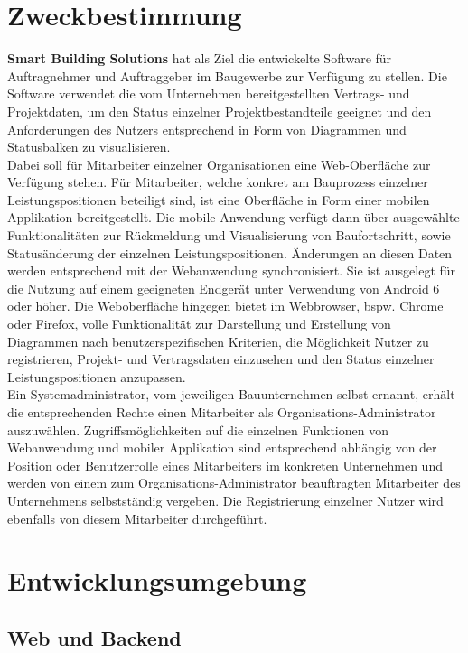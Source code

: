 {\section{Zweckbestimmung}\label{sec:zweckbestimmung}
\textbf{Smart Building Solutions} hat als Ziel die entwickelte Software f\"ur Auftragnehmer und Auftraggeber im Baugewerbe zur Verf\"ugung zu stellen.  Die Software verwendet die vom Unternehmen bereitgestellten Vertrags- und Projektdaten,  um den Status einzelner Projektbestandteile geeignet und den Anforderungen des Nutzers entsprechend in Form von Diagrammen und Statusbalken zu visualisieren. \\
Dabei soll f\"ur Mitarbeiter einzelner Organisationen eine Web-Oberfl\"ache zur Verf\"ugung stehen.  F\"ur  Mitarbeiter,  welche konkret am Bauprozess einzelner Leistungspositionen beteiligt sind,  ist eine Oberfl\"ache in Form einer mobilen Applikation bereitgestellt.  Die mobile Anwendung verf\"ugt dann \"uber ausgew\"ahlte Funktionalit\"aten zur R\"uckmeldung und Visualisierung von Baufortschritt,  sowie Status\"anderung der einzelnen Leistungspositionen.  \"Anderungen an diesen Daten werden entsprechend mit der Webanwendung synchronisiert.  Sie ist ausgelegt f\"ur die Nutzung auf einem geeigneten Endger\"at unter Verwendung von Android 6 oder h\"oher.  Die Weboberfl\"ache hingegen bietet im Webbrowser,  bspw. Chrome oder Firefox, volle Funktionalit\"at zur Darstellung und Erstellung von Diagrammen nach benutzerspezifischen Kriterien, die M\"oglichkeit Nutzer zu registrieren,  Projekt- und Vertragsdaten einzusehen und den Status einzelner Leistungspositionen anzupassen. \\
Ein Systemadministrator, vom jeweiligen Bauunternehmen selbst ernannt,  erh\"alt die entsprechenden Rechte  einen Mitarbeiter als Organisations-Administrator auszuw\"ahlen.
Zugriffsm\"oglichkeiten auf die einzelnen Funktionen von Webanwendung und mobiler Applikation sind entsprechend abh\"angig von der Position oder Benutzerrolle eines Mitarbeiters im konkreten Unternehmen und werden von einem zum Organisations-Administrator beauftragten Mitarbeiter des Unternehmens selbstst\"andig vergeben.  Die Registrierung einzelner Nutzer wird ebenfalls von diesem Mitarbeiter durchgef\"uhrt.

\section{Entwicklungsumgebung}\label{sec:entwicklungsumgebung}

\subsection{Web und Backend}

}

